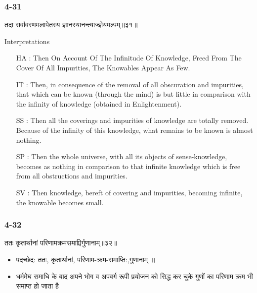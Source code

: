 \begin{frame}[fragile]\frametitle{4-31}
\begin{sanskrit}
तदा सर्वावरणमलापेतस्य ज्ञानस्यानन्त्याज्ज्ञेयमल्पम्॥३१॥
\end{sanskrit}

Interpretations
\begin{itemize}	
\item [HA]: Then On Account Of The Infinitude Of Knowledge, Freed From The Cover Of All Impurities, The Knowables Appear As Few.
\item [IT]: Then, in consequence of the removal of all obscuration and impurities, that which can be known (through the mind) is but little in comparison with the infinity of knowledge (obtained in Enlightenment).
\item [SS]: Then all the coverings and impurities of knowledge are totally removed. Because of the infinity of this knowledge, what remains to be known is almost nothing.
\item [SP]: Then the whole universe, with all its objects of sense-knowledge, becomes as nothing in comparison to that infinite knowledge which is free from all obstructions and impurities.
\item [SV]: Then knowledge, bereft of covering and impurities, becoming infinite, the knowable becomes small. 
\end{itemize}
\end{frame}

\begin{frame}[fragile]\frametitle{4-32}
\begin{sanskrit}
ततः कृतार्थानां परिणामक्रमसमाप्तिर्गुणानाम्॥३२॥
\end{sanskrit}


\begin{itemize}
\item पदच्छेद:  ततः, कृतार्थानां, परिणाम-क्रम-समाप्ति:,गुणानाम् ॥
\item धर्ममेघ समाधि के बाद अपने भोग  व अपवर्ग रूपी प्रयोजन को सिद्ध कर चुके गुणों का परिणाम क्रम भी समाप्त हो जाता है
\end{itemize}
\end{frame}

